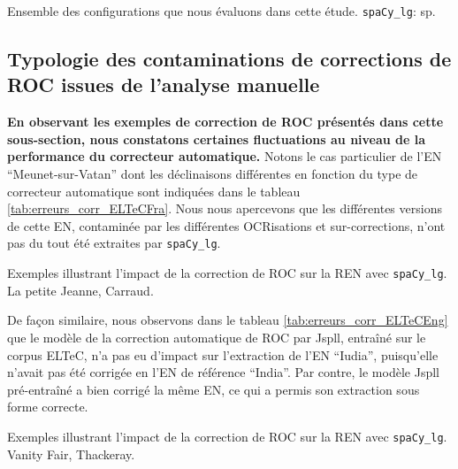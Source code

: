 \begin{table}[h!]
    \centering
   
    \caption{Ensemble des configurations que nous évaluons dans cette étude. \texttt{spaCy\_lg}: sp.}
    \label{tab:config}
\end{table}

\subsection{Typologie des contaminations de corrections de ROC issues de l'analyse manuelle}
\label{subsec:Typologie_COR-OCR-IMPACT-NER}

\textbf{En observant les exemples de correction de ROC présentés dans cette sous-section, nous constatons certaines fluctuations au niveau de la performance du correcteur automatique.}
Notons le cas particulier de l'EN ``Meunet-sur-Vatan'' dont les déclinaisons différentes en fonction du type de correcteur automatique sont indiquées dans le tableau \ref{tab:erreurs_corr_ELTeCFra}. Nous nous apercevons que les différentes versions de cette EN, contaminée par les différentes OCRisations et sur-corrections, n'ont pas du tout été extraites par \texttt{spaCy\_lg}.

\begin{table}[h!]
    \small
    \centering
   
     \caption{Exemples illustrant l'impact de la correction de ROC sur la REN avec \texttt{spaCy\_lg}. {\normalfont La petite Jeanne}, Carraud.}
    \label{tab:erreurs_corr_ELTeCFra}
\end{table}

De façon similaire, nous observons dans le tableau \ref{tab:erreurs_corr_ELTeCEng} que le modèle de la correction automatique de ROC par Jspll, entraîné sur le corpus ELTeC, n'a pas eu d'impact sur l'extraction de l'EN ``Iudia'', puisqu'elle n'avait pas été corrigée en l'EN de référence ``India''. Par contre, le modèle Jspll pré-entraîné a bien corrigé la même EN, ce qui a permis son extraction sous forme correcte.
\begin{table}[h!]
\small
    \centering
   
    \caption{Exemples illustrant l'impact de la correction de ROC sur la REN avec \texttt{spaCy\_lg}. {\normalfont Vanity Fair}, Thackeray.}
    \label{tab:erreurs_corr_ELTeCEng}
\end{table}


